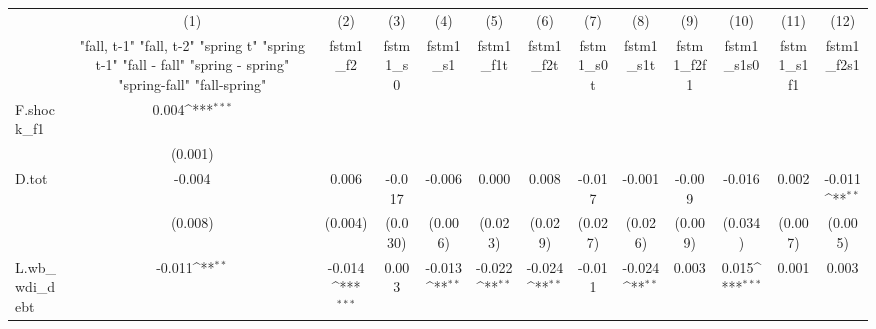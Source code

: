 {
\def\sym#1{\ifmmode^{#1}\else\(^{#1}\)\fi}
\begin{tabular}{l*{12}{c}}
\toprule
            &\multicolumn{1}{c}{(1)}&\multicolumn{1}{c}{(2)}&\multicolumn{1}{c}{(3)}&\multicolumn{1}{c}{(4)}&\multicolumn{1}{c}{(5)}&\multicolumn{1}{c}{(6)}&\multicolumn{1}{c}{(7)}&\multicolumn{1}{c}{(8)}&\multicolumn{1}{c}{(9)}&\multicolumn{1}{c}{(10)}&\multicolumn{1}{c}{(11)}&\multicolumn{1}{c}{(12)}\\
            &\multicolumn{1}{c}{  "fall, t-1" "fall, t-2" "spring t" "spring t-1"  "fall - fall" "spring - spring" "spring-fall" "fall-spring" }&\multicolumn{1}{c}{fstm1\_f2}&\multicolumn{1}{c}{fstm1\_s0}&\multicolumn{1}{c}{fstm1\_s1}&\multicolumn{1}{c}{fstm1\_f1t}&\multicolumn{1}{c}{fstm1\_f2t}&\multicolumn{1}{c}{fstm1\_s0t}&\multicolumn{1}{c}{fstm1\_s1t}&\multicolumn{1}{c}{fstm1\_f2f1}&\multicolumn{1}{c}{fstm1\_s1s0}&\multicolumn{1}{c}{fstm1\_s1f1}&\multicolumn{1}{c}{fstm1\_f2s1}\\
\midrule
F.shock\_f1  &       0.004\sym{***}&                     &                     &                     &                     &                     &                     &                     &                     &                     &                     &                     \\
            &     (0.001)         &                     &                     &                     &                     &                     &                     &                     &                     &                     &                     &                     \\
\addlinespace
D.tot       &      -0.004         &       0.006         &      -0.017         &      -0.006         &       0.000         &       0.008         &      -0.017         &      -0.001         &      -0.009         &      -0.016         &       0.002         &      -0.011\sym{**} \\
            &     (0.008)         &     (0.004)         &     (0.030)         &     (0.006)         &     (0.023)         &     (0.029)         &     (0.027)         &     (0.026)         &     (0.009)         &     (0.034)         &     (0.007)         &     (0.005)         \\
\addlinespace
L.wb\_wdi\_debt&      -0.011\sym{**} &      -0.014\sym{***}&       0.003         &      -0.013\sym{**} &      -0.022\sym{**} &      -0.024\sym{**} &      -0.011         &      -0.024\sym{**} &       0.003         &       0.015\sym{***}&       0.001         &       0.003         \\

\end{tabular}}
